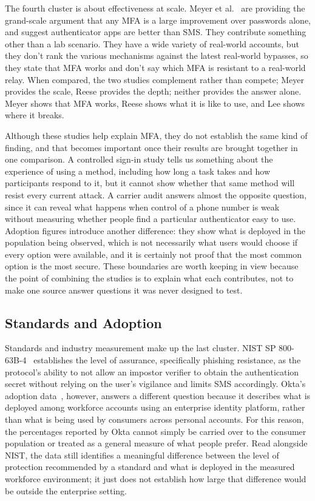 \documentclass[sigconf]{acmart}
\begin{document}
The fourth cluster is about effectiveness at scale. Meyer et al.~\cite{meyer:2023:mfa} are providing the grand-scale argument that any MFA is a large improvement over passwords alone, and suggest authenticator apps are better than SMS. They contribute something other than a lab scenario. They have a wide variety of real-world accounts, but they don't rank the various mechanisms against the latest real-world bypasses, so they state that MFA works and don't say which MFA is resistant to a real-world relay. When compared, the two studies complement rather than compete; Meyer provides the scale, Reese provides the depth; neither provides the answer alone. Meyer shows that
MFA works, Reese shows what it is like to use, and Lee shows where it
breaks.

Although these studies help explain MFA, they do not establish the same kind of finding, and that becomes important once their results are brought together in one comparison. A controlled sign-in study tells us something about the experience of using a method, including how long a task takes and how participants respond to it, but it cannot show whether that same method will resist every current attack. A carrier audit answers almost the opposite question, since it can reveal what happens when control of a phone number is weak without measuring whether people find a particular authenticator easy to use. Adoption figures introduce another difference: they show what is deployed in the population being observed, which is not necessarily what users would choose if every option were available, and it is certainly not proof that the most common option is the most secure. These boundaries are worth keeping in view because the point of combining the studies is to explain what each contributes, not to make one source answer questions it was never designed to test.

\subsection{Standards and Adoption}

Standards and industry measurement make up the last cluster. NIST SP
800-63B-4~\cite{nist:2025:sp80063b4} establishes the level of assurance, specifically phishing
resistance, as the protocol's ability to not allow an impostor verifier to obtain the authentication
secret without relying on the user's vigilance and limits SMS accordingly. Okta's adoption data~\cite{okta:2024:signin}, however, answers a different question because it describes what is deployed among workforce accounts using an enterprise identity platform, rather than what is being used by consumers across personal accounts. For this reason, the percentages reported by Okta cannot simply be carried over to the consumer population or treated as a general measure of what people prefer. Read alongside NIST, the data still identifies a meaningful difference between the level of protection recommended by a standard and what is deployed in the measured workforce environment; it just does not establish how large that difference would be outside the enterprise setting.
\end{document}
